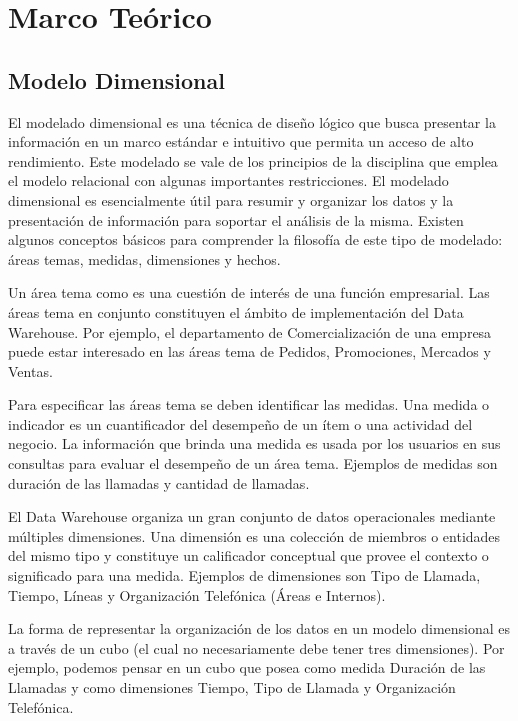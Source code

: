 \section{Marco Teórico} 



\subsection{Modelo Dimensional}
El modelado dimensional es una técnica de diseño lógico que busca presentar la información en un marco estándar e intuitivo que permita un acceso de alto rendimiento. Este modelado se vale de los principios de la disciplina que emplea el modelo relacional con algunas importantes restricciones. El modelado dimensional es esencialmente útil para resumir y organizar los datos y la presentación de información para soportar el análisis de la misma. Existen algunos conceptos básicos para comprender la filosofía de este tipo de modelado: áreas temas, medidas, dimensiones y hechos. \newline


Un área tema como es una cuestión de interés de una función empresarial. Las áreas tema en conjunto constituyen el ámbito de implementación del Data Warehouse. Por ejemplo, el departamento de Comercialización de una empresa puede estar interesado en las áreas tema de Pedidos, Promociones, Mercados y Ventas.  \newline


Para especificar las áreas tema se deben identificar las medidas. Una medida o indicador es un cuantificador del desempeño de un ítem o una actividad del negocio. La información que brinda una medida es usada por los usuarios en sus consultas para evaluar el desempeño de un área tema. Ejemplos de medidas son duración de las llamadas y cantidad de llamadas.  \newline

El Data Warehouse organiza un gran conjunto de datos operacionales mediante múltiples dimensiones. Una dimensión es una colección de miembros o entidades del mismo tipo y constituye un calificador conceptual que provee el contexto o significado para una medida. Ejemplos de dimensiones son Tipo de Llamada, Tiempo, Líneas y Organización Telefónica (Áreas e Internos). \newline

La forma de representar la organización de los datos en un modelo dimensional es a través de un cubo (el cual no necesariamente debe tener tres dimensiones). Por ejemplo, podemos pensar en un cubo que posea como medida Duración de las Llamadas y como dimensiones Tiempo, Tipo de Llamada y Organización Telefónica. \newline


